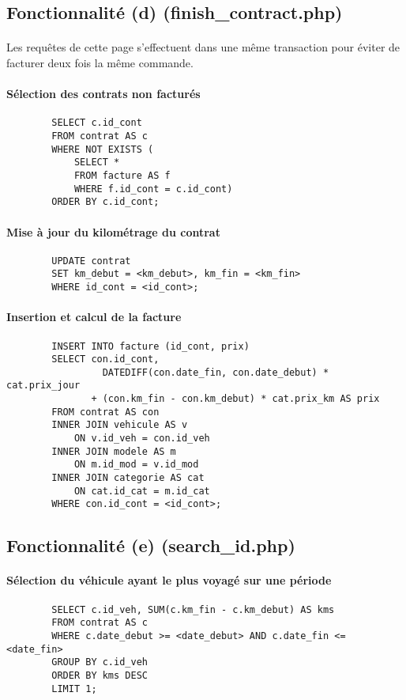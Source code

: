 \documentclass[a4paper]{article}
\begin{document}
  \subsection{Fonctionnalité (d) (finish\_contract.php)}

    \paragraph{}Les requêtes de cette page s'effectuent dans une même
transaction pour éviter de facturer deux fois la même commande.

    \paragraph{Sélection des contrats non facturés}
    \begin{verbatim}
        SELECT c.id_cont
        FROM contrat AS c
        WHERE NOT EXISTS (
            SELECT *
            FROM facture AS f
            WHERE f.id_cont = c.id_cont)
        ORDER BY c.id_cont;
    \end{verbatim}

    \paragraph{Mise à jour du kilométrage du contrat}
    \begin{verbatim}
        UPDATE contrat
        SET km_debut = <km_debut>, km_fin = <km_fin>
        WHERE id_cont = <id_cont>;
    \end{verbatim}

    \paragraph{Insertion et calcul de la facture}
    \begin{verbatim}
        INSERT INTO facture (id_cont, prix)
        SELECT con.id_cont,
                 DATEDIFF(con.date_fin, con.date_debut) * cat.prix_jour
               + (con.km_fin - con.km_debut) * cat.prix_km AS prix
        FROM contrat AS con
        INNER JOIN vehicule AS v
            ON v.id_veh = con.id_veh
        INNER JOIN modele AS m
            ON m.id_mod = v.id_mod
        INNER JOIN categorie AS cat
            ON cat.id_cat = m.id_cat
        WHERE con.id_cont = <id_cont>;
    \end{verbatim}

  \subsection{Fonctionnalité (e) (search\_id.php)}

    \paragraph{Sélection du véhicule ayant le plus voyagé sur une période}
    \begin{verbatim}
        SELECT c.id_veh, SUM(c.km_fin - c.km_debut) AS kms
        FROM contrat AS c
        WHERE c.date_debut >= <date_debut> AND c.date_fin <= <date_fin>
        GROUP BY c.id_veh
        ORDER BY kms DESC
        LIMIT 1;
    \end{verbatim}
\end{document}

